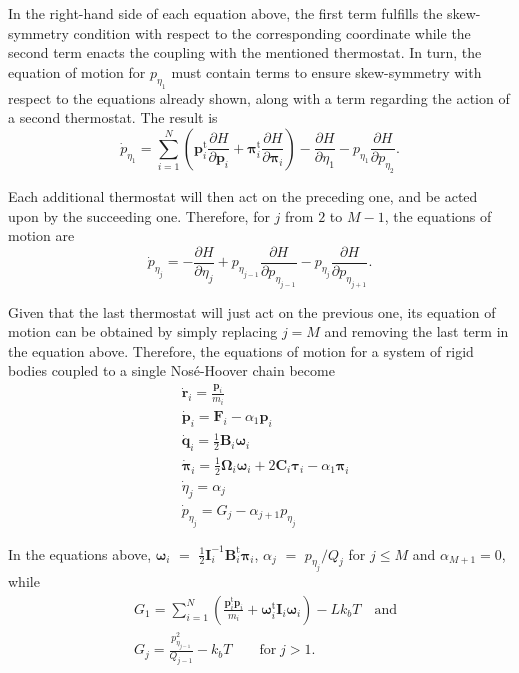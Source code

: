 \documentclass[aip,jcp,reprint,amsmath,amssymb]{revtex4-1}
\newcommand{\mt}[1]{\boldsymbol{\mathbf{#1}}}           %
\newcommand{\vt}[1]{\boldsymbol{\mathbf{#1}}}           %
\newcommand{\tr}[1]{#1^\text{t}}                        %
\newcommand{\diff}[2]{\dfrac{\partial #1}{\partial #2}} %
\begin{document}
In the right-hand side of each equation above, the first term fulfills the skew-symmetry condition with respect to the corresponding coordinate while the second term enacts the coupling with the mentioned thermostat. In turn, the equation of motion for $p_{\eta_1}$ must contain terms to ensure skew-symmetry with respect to the equations already shown, along with a term regarding the action of a second thermostat. The result is
\[
{\dot p}_{\eta_1} = \sum_{i=1}^N \left( \tr{\vt p_i} \diff{H}{\vt p_i} + \tr{\vt \pi_i} \diff{H}{\vt \pi_i}\right) - \diff{H}{\eta_1} - p_{\eta_1} \diff{H}{p_{\eta_2}}.
\]

Each additional thermostat will then act on the preceding one, and be acted upon by the succeeding one. Therefore, for $j$ from $2$ to $M-1$, the equations of motion are
\[
{\dot p}_{\eta_j} = -\diff{H}{\eta_j} + p_{\eta_{j-1}} \diff{H}{p_{\eta_{j-1}}} - p_{\eta_j} \diff{H}{p_{\eta_{j+1}}}.
\]

Given that the last thermostat will just act on the previous one, its equation of motion can be obtained by simply replacing $j = M$ and removing the last term in the equation above. Therefore, the equations of motion for a system of rigid bodies coupled to a single Nos\'e-Hoover chain become
\begin{subequations}
\label{eq:nhc_system}
\begin{align}
&\dot{\vt r}_i = \frac{{\vt p}_i}{m_i} \\ 
&\dot{\vt p}_i = {\vt F}_i - \alpha_1 \vt p_i \label{eq:nhc_p} \\
&\dot{\vt q}_i = \frac{1}{2} \mt B_i \vt \omega_i \label{eq:nhc_q} \\
&\dot{\vt \pi}_i = \frac{1}{2} \mt \Omega_i \vt \omega_i + 2 \mt C_i \vt \tau_i - \alpha_1 \vt \pi_i \label{eq:nhc_pi} \\
&\dot{\eta}_j = \alpha_j \label{eq:nhc_eta} \\
&{\dot p}_{\eta_j} = G_j - \alpha_{j+1} p_{\eta_j}  \label{eq:nhc_p_eta}
\end{align}
\end{subequations}

In the equations above, ${\vt \omega}_i$ $=$ $\frac{1}{2} {\mt I}_i^{-1} \tr{\mt B}_i {\vt \pi}_i$, $\alpha_j$ $=$ ${p_{\eta_j}}/{Q_j}$ for $j \leq M$ and $\alpha_{M+1} = 0$, while
\begin{align*}
&G_1 = \sum_{i=1}^N \left( \frac{\tr{\vt p}_i{\vt p}_i}{m_i} + \tr{\vt \omega}_i \mt I_i \vt \omega_i \right) - L k_b T \quad \text{and}\\
&G_j = \frac{p_{\eta_{j-1}}^2}{Q_{j-1}} - k_b T \qquad \text{for} \; j > 1.
\end{align*}
\end{document}
